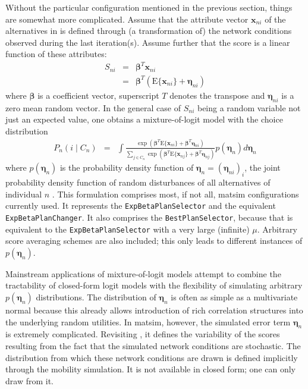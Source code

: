 Without the particular configuration mentioned in the previous section, things
are somewhat more complicated.
Assume that the attribute vector $\mathbf{x}_{ni}$ of the alternatives in
 is defined through (a transformation of) the
network conditions observed during the last iteration(s). Assume further that
the score is a linear function of these attributes:
\begin{eqnarray}
S_{ni} 
& = & 
\boldsymbol{\beta}^{T}\mathbf{x}_{ni}\\
 & = & \boldsymbol{\beta}^{T}(\text{E}\{\mathbf{x}_{ni}\}+\boldsymbol{\eta}_{ni})\label{eq:score}
\end{eqnarray}
where $\boldsymbol{\beta}$ is a coefficient vector, superscript $T$ denotes the
transpose\corr{,}{} and $\boldsymbol{\eta}_{ni}$ is a zero mean random vector. 
In the general case of $S_{ni}$ being a random
variable not just an expected value, one obtains a
mixture-of-logit model with the choice distribution
\begin{eqnarray}
P_{n}(i\mid C_{n}) & = & 
\int\frac{\exp\left(\boldsymbol{\beta}^{T}\text{E}\{\mathbf{x}_{ni}\}+\boldsymbol{\beta}^{T}\boldsymbol{\eta}_{ni}\right)}
{\sum_{j\in C_{n}}\exp\left(\boldsymbol{\beta}^{T}\text{E}\{\mathbf{x}_{nj}\}+\boldsymbol{\beta}^{T}\boldsymbol{\eta}_{nj}\right)}
p(\boldsymbol{\eta}_{n})d\boldsymbol{\eta}_{n}\label{eq:mixture-of-logit}
\end{eqnarray}
where $p(\boldsymbol{\eta}_{n})$ is the probability density function of 
$\boldsymbol{\eta}_{n}=(\boldsymbol{\eta}_{ni})_i$, 
\ie the joint probability
density function of  random disturbances of all alternatives of
individual $n$
\citep[][Section 6]{Train_2003}. This formulation comprises most, if not all,
\gls{matsim} configurations currently used. It represents the \lstinline{ExpBetaPlanSelector}
and the equivalent \lstinline{ExpBetaPlanChanger}. It also comprises
the \lstinline{BestPlanSelector}, because that is equivalent to the \lstinline{ExpBetaPlanSelector}
with a very large (infinite) $\mu$. Arbitrary score averaging schemes
are also included; this only leads to different instances of $p(\boldsymbol{\eta}_{n})$.

Mainstream applications of mixture-of-logit models attempt to combine
the tractability of closed-form logit models with the flexibility of
simulating arbitrary $p(\boldsymbol{\eta}_n)$ distributions.
The distribution of $\boldsymbol{\eta}_n$ is often as simple as a multivariate
normal\corr{,}{} because this already allows  introduction of
rich correlation structures into the underlying random utilities. In \gls{matsim}, however, the simulated
error term $\boldsymbol{\eta}_n$ is extremely complicated. Revisiting ,
it defines the variability of the scores resulting from the fact
that the simulated network conditions are stochastic. The distribution
from which these network conditions are drawn is defined implicitly
through the mobility simulation. It is not available in closed form;
one can only draw from it.

